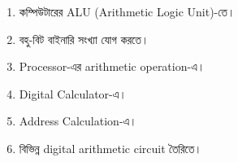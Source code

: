\begin{enumerate}[leftmargin=*,itemsep=2pt]

    \item কম্পিউটারের
    \textenglish{ALU (Arithmetic Logic Unit)}-তে।

    \item বহু-বিট বাইনারি সংখ্যা যোগ করতে।

    \item \textenglish{Processor}-এর
    \textenglish{arithmetic operation}-এ।

    \item \textenglish{Digital Calculator}-এ।

    \item \textenglish{Address Calculation}-এ।

    \item বিভিন্ন
    \textenglish{digital arithmetic circuit} তৈরিতে।

\end{enumerate}


